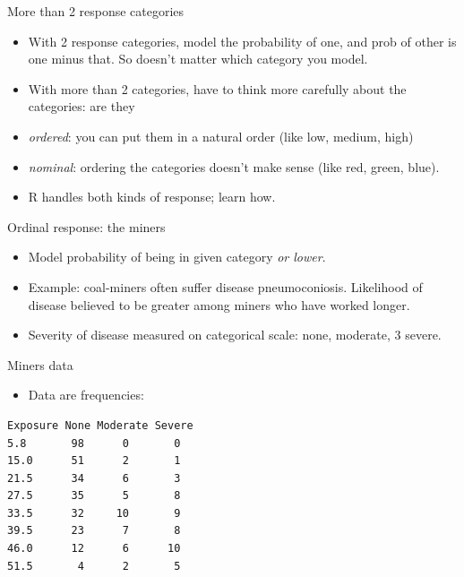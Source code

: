 \documentclass[
  ignorenonframetext,
]{beamer}
\providecommand{\tightlist}{%
  \setlength{\itemsep}{0pt}\setlength{\parskip}{0pt}}
\begin{document}
\begin{frame}{More than 2 response categories}
\protect\hypertarget{more-than-2-response-categories}{}

\begin{itemize}
\item
  With 2 response categories, model the probability of one, and prob of
  other is one minus that. So doesn't matter which category you model.
\item
  With more than 2 categories, have to think more carefully about the
  categories: are they
\item
  \emph{ordered}: you can put them in a natural order (like low, medium,
  high)
\item
  \emph{nominal}: ordering the categories doesn't make sense (like red,
  green, blue).
\item
  R handles both kinds of response; learn how.
\end{itemize}

\end{frame}

\begin{frame}{Ordinal response: the miners}
\protect\hypertarget{ordinal-response-the-miners}{}

\begin{itemize}
\item
  Model probability of being in given category \emph{or lower}.
\item
  Example: coal-miners often suffer disease pneumoconiosis. Likelihood
  of disease believed to be greater among miners who have worked longer.
\item
  Severity of disease measured on categorical scale: none, moderate, 3
  severe.
\end{itemize}

\end{frame}

\begin{frame}[fragile]{Miners data}
\protect\hypertarget{miners-data}{}

\begin{itemize}
\tightlist
\item
  Data are frequencies:
\end{itemize}

\begin{verbatim}
Exposure None Moderate Severe
5.8       98      0       0
15.0      51      2       1
21.5      34      6       3
27.5      35      5       8
33.5      32     10       9
39.5      23      7       8
46.0      12      6      10
51.5       4      2       5
\end{verbatim}

\end{frame}
\end{document}
